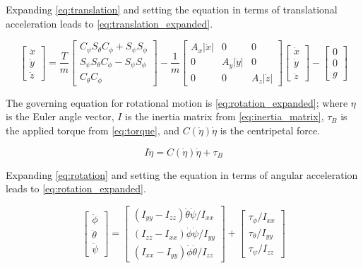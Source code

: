 \documentclass[letterpaper,12pt,titlepage,oneside,final]{book}
\begin{document}
Expanding \eqref{eq:translation} and setting the equation in terms of translational acceleration leads to \eqref{eq:translation_expanded}.

\begin{equation} \label{eq:translation_expanded}
\begin{bmatrix}
\ddot{x} \\
\ddot{y} \\
\ddot{z}
\end{bmatrix} 
=
\dfrac{T}{m}
\begin{bmatrix}
C_{\psi}S_{\theta}C_{\phi} + S_{\psi}S_{\phi} \\
S_{\psi}S_{\theta}C_{\phi} - S_{\psi}S_{\phi} \\
C_{\theta}C_{\phi}
\end{bmatrix}
-
\dfrac{1}{m}
\begin{bmatrix}
A_{x}|\dot{x}| & 0 & 0 \\
0 & A_{y}|\dot{y}| & 0 \\
0 & 0 & A_{z}|\dot{z}|
\end{bmatrix}
\begin{bmatrix}
\dot{x} \\
\dot{y} \\
\dot{z}
\end{bmatrix}
-
\begin{bmatrix}
0 \\
0 \\
g
\end{bmatrix}
\end{equation}

The governing equation for rotational motion is \eqref{eq:rotation_expanded}; where $\eta$ is the Euler angle vector, $I$ is the inertia matrix from \eqref{eq:inertia_matrix}, $\tau_{B}$ is the applied torque from \eqref{eq:torque}, and $C(\dot{\eta})\dot{\eta}$ is the centripetal force. 

\begin{equation} \label{eq:rotation}
I\ddot{\eta} = C(\dot{\eta})\dot{\eta} + \tau_{B}
\end{equation}

Expanding \eqref{eq:rotation} and setting the equation in terms of angular acceleration leads to \eqref{eq:rotation_expanded}.

\begin{equation} \label{eq:rotation_expanded}
\begin{bmatrix}
\ddot{\phi} \\
\ddot{\theta} \\
\ddot{\psi}
\end{bmatrix}
=
\begin{bmatrix}
(I_{yy} - I_{zz})\dot{\theta}\dot{\psi}/I_{xx} \\
(I_{zz} - I_{xx})\dot{\phi}\dot{\psi}/I_{yy} \\
(I_{xx} - I_{yy})\dot{\phi}\dot{\theta}/I_{zz}
\end{bmatrix}
+
\begin{bmatrix}
\tau_{\phi}/I_{xx} \\
\tau_{\theta}/I_{yy} \\
\tau_{\psi}/I_{zz}
\end{bmatrix}
\end{equation}
\end{document}
